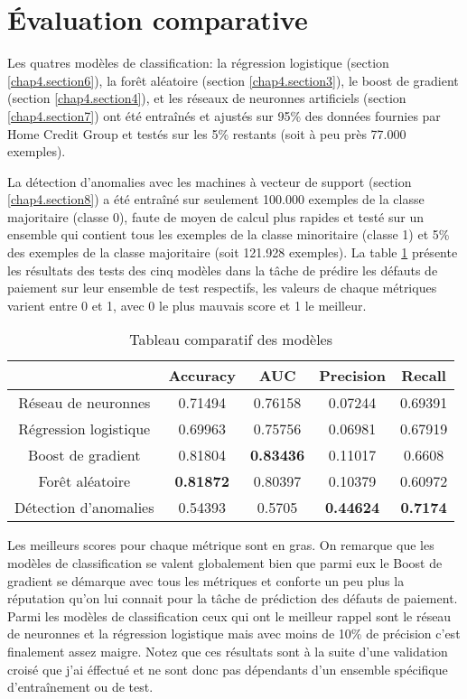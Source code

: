 \section{Évaluation comparative}
\label{chap5.section2}
Les quatres modèles de classification: la régression logistique (section \ref{chap4.section6}), la forêt aléatoire (section \ref{chap4.section3}), le boost de gradient (section \ref{chap4.section4}), et les réseaux de neuronnes artificiels (section \ref{chap4.section7}) ont été entraînés et ajustés sur 95\% des données fournies par Home Credit Group et testés sur les 5\% restants (soit à peu près 77.000 exemples).

La détection d'anomalies avec les machines à vecteur de support (section \ref{chap4.section8}) a été entraîné sur seulement 100.000 exemples de la classe majoritaire (classe 0), faute de moyen de calcul plus rapides et testé sur un ensemble qui contient tous les exemples de la classe minoritaire (classe 1) et 5\% des exemples de la classe majoritaire (soit 121.928 exemples). La table \ref{tab:tab3} présente les résultats des tests des cinq modèles dans la tâche de prédire les défauts de paiement sur leur ensemble de test respectifs, les valeurs de chaque métriques varient entre 0 et 1, avec 0 le plus mauvais score et 1 le meilleur.

\begin{table}
    \centering
    \begin{tabular}{ c|c|c|c|c| }
         & Accuracy & AUC & Precision & Recall \\
         \hline
        Réseau de neuronnes & 0.71494 & 0.76158 & 0.07244 & 0.69391 \\
        \hline
        Régression logistique & 0.69963 & 0.75756 & 0.06981 & 0.67919 \\
        \hline
        Boost de gradient & 0.81804 & \textbf{0.83436} & 0.11017 & 0.6608 \\
        \hline
        Forêt aléatoire & \textbf{0.81872} & 0.80397 & 0.10379 & 0.60972 \\
        \hline
        Détection d'anomalies & 0.54393 & 0.5705 & \textbf{0.44624} & \textbf{0.7174} \\
        \hline
    \end{tabular}
    \caption{Tableau comparatif des modèles}
    \label{tab:tab3}
\end{table}

Les meilleurs scores pour chaque métrique sont en gras. On remarque que les modèles de classification se valent globalement bien que parmi eux le Boost de gradient se démarque avec tous les métriques et conforte un peu plus la réputation qu'on lui connait pour la tâche de prédiction des défauts de paiement. Parmi les modèles de classification ceux qui ont le meilleur rappel sont le réseau de neuronnes et la régression logistique mais avec moins de 10\% de précision c'est finalement assez maigre. Notez que ces résultats sont à la suite d'une validation croisé que j'ai éffectué et ne sont donc pas dépendants d'un ensemble spécifique d'entraînement ou de test.

